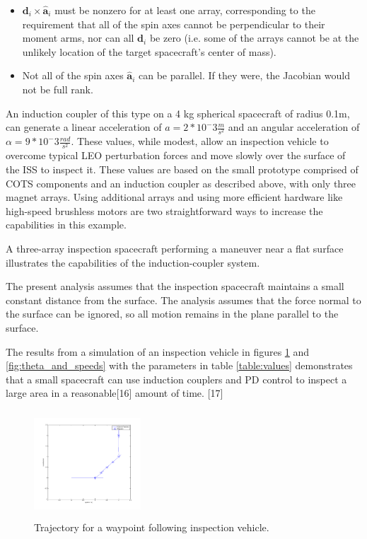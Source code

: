 \documentclass{article}
\begin{document}
\begin{itemize}
\item  $\boldsymbol{d}_i{\times}\hat{\boldsymbol{a}}_i$ must be nonzero for at least one array, corresponding to the requirement that all of the spin axes cannot be perpendicular to their moment arms, nor can all $\boldsymbol{d}_i$ be zero (i.e. some of the arrays cannot be at the unlikely location of the target spacecraft's center of mass).
\item  Not all of the spin axes $\hat{\boldsymbol{a}}_i$ can be parallel. If they were, the Jacobian would not be full rank.
\end{itemize}

An induction coupler of this type on a 4 kg spherical spacecraft of radius 0.1m, can generate a linear acceleration of
$a = 2*10^-3 \frac{m}{s^2}$ 
and an angular acceleration of 
$\alpha = 9*10^-3 \frac{rad}{s^2}$. 
These values, while modest, allow an inspection vehicle to overcome typical LEO perturbation forces
 and move slowly over the surface of the ISS to inspect it. These values are based on the small prototype comprised of COTS components and an induction coupler as described above, with only three magnet arrays. Using additional arrays and using more efficient hardware like high-speed brushless motors are two straightforward ways to increase the capabilities in this example.

A three-array inspection spacecraft performing a maneuver near a flat surface illustrates the capabilities of the induction-coupler system. 

The present analysis assumes that the inspection spacecraft maintains a small constant distance from the surface. The analysis assumes that the force normal to the surface can be ignored, so all motion remains in the plane parallel to the surface. 

The results from a simulation of an inspection vehicle in figures \ref{fig:trajectory} and \ref{fig:theta_and_speeds} with the parameters in table \ref{table:values} demonstrates that a small spacecraft can use induction couplers and PD control to inspect a large area in a 
reasonable[16] amount of time. [17]

\begin{figure}

\includegraphics[width = 4cm, height = 4cm ]{figures/planar_trajectory.png}
\caption{Trajectory for a waypoint following inspection vehicle.}
\label{fig:trajectory}
\end{figure}
\end{document}
